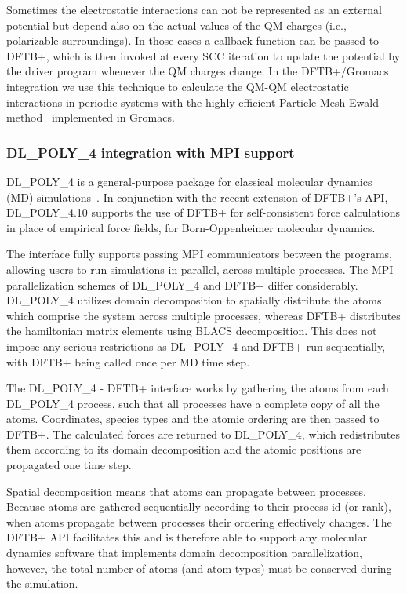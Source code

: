 \documentclass[reprint,onecolumn,superscriptaddress]{revtex4-1}
\newcommand{\dftbp}{DFTB+}
\begin{document}
Sometimes the electrostatic interactions can not be represented as an external
potential but depend also on the actual values of the QM-charges (i.e.,
polarizable surroundings). In those cases a callback function can be
passed to \dftbp{}, which is then invoked at every SCC iteration to update the
potential by the driver program whenever the QM charges
change. In the \dftbp{}/Gromacs integration we use this technique to calculate
the QM-QM electrostatic interactions in periodic systems with the highly
efficient Particle Mesh Ewald method~\cite{Darden1993} implemented in Gromacs.

\subsubsection{DL\_POLY\_4 integration with MPI support}

DL\_POLY\_4 is a general-purpose package for classical molecular dynamics (MD)
simu\-la\-tions~\cite{dl_poly2006}. In conjunction with the recent extension of
\dftbp{}'s API, DL\_POLY\_4.10 supports the use of \dftbp{} for self-consistent
force calculations in place of empirical force fields, for Born-Oppenheimer
molecular dynamics.

The interface fully supports passing MPI communicators between the programs,
allowing users to run simulations in parallel, across multiple processes. The
MPI parallelization schemes of DL\_POLY\_4 and \dftbp{} differ
considerably. DL\_POLY\_4 utilizes domain decomposition to spatially distribute
the atoms which comprise the system across multiple processes, whereas \dftbp{}
distributes the hamiltonian matrix elements using BLACS decomposition. This does
not impose any serious restrictions as DL\_POLY\_4 and \dftbp{} run
sequentially, with \dftbp{} being called once per MD time step.

The DL\_POLY\_4 - \dftbp{} interface works by gathering the atoms from each
DL\_POLY\_4 process, such that all processes have a complete copy of all the
atoms. Coordinates, species types and the atomic ordering are then passed to
\dftbp{}.  The calculated forces are returned to DL\_POLY\_4, which
redistributes them according to its domain decomposition and the atomic
positions are propagated one time step.

Spatial decomposition means that atoms can propagate between processes. Because
atoms are gathered sequentially according to their process id (or rank), when
atoms propagate between processes their ordering effectively changes. The
\dftbp{} API facilitates this and is therefore able to support any molecular
dynamics software that implements domain decomposition parallelization, however,
the total number of atoms (and atom types) must be conserved during the
simulation.
\end{document}

